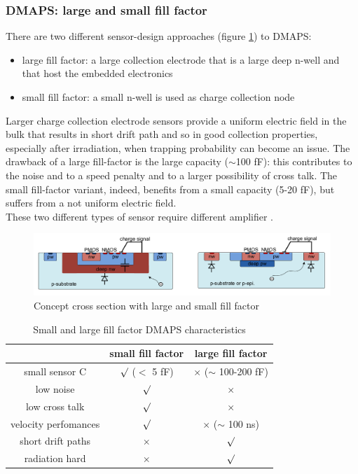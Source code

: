 \begin{titlepage}
\subsubsection{DMAPS: large and small fill factor}
There are two different sensor-design approaches (figure \ref{fig:large_small_sensor_scheme})
to DMAPS:
\begin{itemize}
   \item large fill factor: a large collection electrode that is a large deep n-well
 and that host the embedded electronics
   \item small fill factor: a small n-well is used as charge collection node
\end{itemize}
Larger charge collection electrode sensors provide a uniform electric field in
the bulk that results in short drift path and so in good collection properties,
especially after irradiation, when trapping probability can become an issue. 
The drawback of a large fill-factor is the large
capacity ($\sim$100 fF): this contributes to the noise and to a
speed penalty and to a larger possibility of cross talk.
The small fill-factor variant, indeed, benefits from a small capacity (5-20 fF), but suffers 
from a not uniform electric field. \\
These two different types of sensor require different amplifier .
\begin{figure}
   \centering\includegraphics[width=12cm]{figures/large_small_sensor_scheme.png}
   \caption{Concept cross section with large and small fill factor}
   \label{fig:large_small_sensor_scheme}
\end{figure}

\begin{table}
   \begin{center}
   \begin{tabular}{|c | c |c |}
   \hline
   & small fill factor & large fill factor\\
   \hline
   \hline
   small sensor C & $\surd$ ($<$ 5 fF) & $\times$ ($\sim$ 100-200 fF)\\
   low noise & $\surd$ & $\times$\\
   low cross talk & $\surd$ & $\times$ \\
   velocity perfomances & $\surd$ & $\times$ ($\sim$ 100 ns)\\
   short drift paths & $\times$ & $\surd$ \\
   radiation hard & $\times$ & $\surd$ \\
   \hline
   \end{tabular}
   \caption{Small and large fill factor DMAPS characteristics}
   \label{tab:DMAPS_large_small_fillfactor}
   \end{center}
\end{table}


\end{titlepage}
